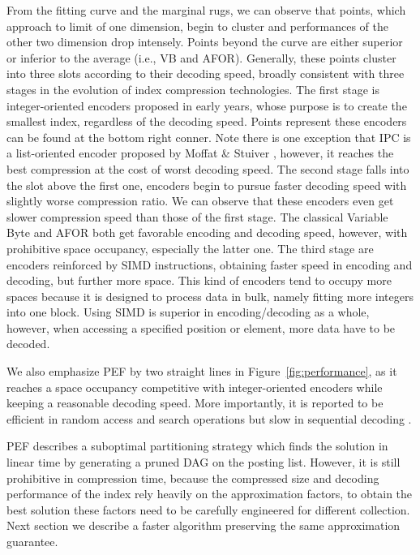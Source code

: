 \documentclass[runningheads,a4paper]{llncs}
\begin{document}
From the fitting curve and the marginal rugs, we can observe that points, which approach to limit of one dimension, begin to cluster and performances of the other two dimension drop intensely.
Points beyond the curve are either superior or inferior to the average (i.e., VB and AFOR).
Generally, these points cluster into three slots according to their decoding speed, broadly consistent with three stages in the evolution of index compression technologies.
The first stage is integer-oriented encoders proposed in early years, whose purpose is to create the smallest index, regardless of the decoding speed.
Points represent these encoders can be found at the bottom right conner.
Note there is one exception that IPC is a list-oriented encoder proposed by Moffat \& Stuiver \cite{moffat2000binary}, however, it reaches the best compression at the cost of worst decoding speed.
The second stage falls into the slot above the first one, encoders begin to pursue faster decoding speed with slightly worse compression ratio.
We can observe that these encoders even get slower compression speed than those of the first stage.
The classical Variable Byte and AFOR both get favorable encoding and decoding speed, however, with prohibitive space occupancy, especially the latter one.
The third stage are encoders reinforced by SIMD instructions, obtaining faster speed in encoding and decoding, but further more space.
This kind of encoders tend to occupy more spaces because it is designed to process data in bulk, namely fitting more integers into one block.
Using SIMD is superior in encoding/decoding as a whole, however, when accessing a specified position or element, more data have to be decoded.

We also emphasize PEF by two straight lines in Figure~\ref{fig:performance}, as it reaches a space occupancy competitive with integer-oriented encoders while keeping a reasonable decoding speed.
More importantly, it is reported to be efficient in random access and search operations but slow in sequential decoding \cite{ottaviano2015optimal,vigna2013quasi}.

PEF describes a suboptimal partitioning strategy which finds the solution in linear time by generating a pruned DAG on the posting list.
However, it is still prohibitive in compression time, because the compressed size and decoding performance of the index rely heavily on the approximation factors, to obtain the best solution these factors need to be carefully engineered for different collection.
Next section we describe a faster algorithm preserving the same approximation guarantee.
\end{document}
